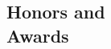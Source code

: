 \documentclass[margin,centered]{res}
\newenvironment{list1}{
  \begin{list}{\ding{113}}{%
      \setlength{\itemsep}{0in}
      \setlength{\parsep}{0in} \setlength{\parskip}{0in}
      \setlength{\topsep}{0in} \setlength{\partopsep}{0in}
      \setlength{\leftmargin}{0.17in}}}{\end{list}}
\newenvironment{list2}{
  \begin{list}{$\bullet$}{%
      \setlength{\itemsep}{0in}
      \setlength{\parsep}{0in} \setlength{\parskip}{0in}
      \setlength{\topsep}{0in} \setlength{\partopsep}{0in}
      \setlength{\leftmargin}{0.2in}}}{\end{list}}
\begin{document}
\begin{resume}









\section{\sc Honors and\\ Awards}


\end{resume}
\end{document}
